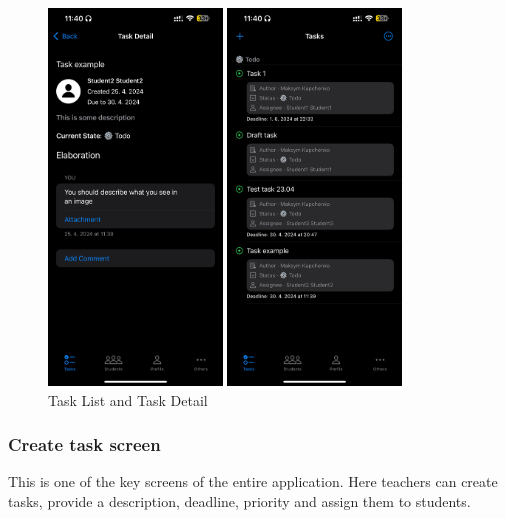 \documentclass[
  biblatex = false,
  language=english,
  figures=false,
  sourcecodes,
  glossaries,
  index
]{kidiplom}
\begin{document}
\begin{figure}[h!]
\centering
\begin{minipage}[b]{0.4\textwidth}
	\includegraphics[height=10cm]{image8}
\end{minipage}
\begin{minipage}[b]{0.4\textwidth}
	\includegraphics[height=10cm]{image9}
\end{minipage}
\caption{Task List and Task Detail}
\label{fig:image8-9}
\end{figure}

\subsubsection{Create task screen}
This is one of the key screens of the entire application. Here teachers can create tasks, provide a description, deadline, priority and assign them to students.
\end{document}
